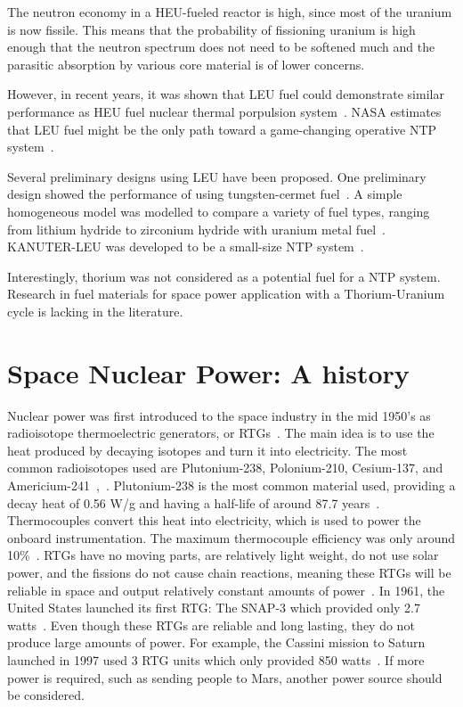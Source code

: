 \documentclass{article}
\begin{document}
The neutron economy in a HEU-fueled reactor is high, since most of the uranium is now fissile. This means that the probability of fissioning uranium is high enough that the neutron spectrum does not need to be softened much and the parasitic absorption by various core material is of lower concerns.

However, in recent years, it was shown that LEU fuel could demonstrate similar performance as HEU fuel nuclear thermal porpulsion system~\cite{ii2016engine,patel2016comparing}. NASA estimates that LEU fuel might be the only path toward a game-changing operative NTP system~\cite{houts2017low}.

Several preliminary designs using LEU have been proposed. One preliminary design showed the performance of using tungsten-cermet fuel~\cite{venneri2013nuclear}. A simple homogeneous model was modelled to compare a variety of fuel types, ranging from lithium hydride to zirconium hydride with uranium metal fuel~\cite{lee2015neutronic}. KANUTER-LEU was developed to be a small-size NTP system~\cite{nam2016preliminary}.

Interestingly, thorium was not considered as a potential fuel for a NTP system. Research in fuel materials for space power application with a Thorium-Uranium cycle is lacking in the literature.



\section{Space Nuclear Power: A history}
\label{sec:bkgd}


Nuclear power was first introduced to the space industry in the mid 1950's as radioisotope thermoelectric generators, or RTGs~\cite{doe0071}. The main idea is to use the heat produced by decaying isotopes and turn it into electricity. The most common radioisotopes used are Plutonium-238, Polonium-210, Cesium-137, and Americium-241~\cite{kinglecture},~\cite{webworldnuclear}. Plutonium-238 is the most common material used, providing a decay heat of 0.56 W/g and having a half-life of around 87.7 years~\cite{webworldnuclear}. Thermocouples convert this heat into electricity, which is used to power the onboard instrumentation. The maximum thermocouple efficiency was only around 10\%~\cite{engler1987atomic}. RTGs have no moving parts, are relatively light weight, do not use solar power, and the fissions do not cause chain reactions, meaning these RTGs will be reliable in space and output relatively constant amounts of power~\cite{engler1987atomic}. In 1961, the United States launched its first RTG: The SNAP-3 which provided only 2.7 watts~\cite{doe0071}. Even though these RTGs are reliable and long lasting, they do not produce large amounts of power. For example, the Cassini mission to Saturn launched in 1997 used 3 RTG units which only provided 850 watts~\cite{doe0071}. If more power is required, such as sending people to Mars, another power source should be considered.
\end{document}

